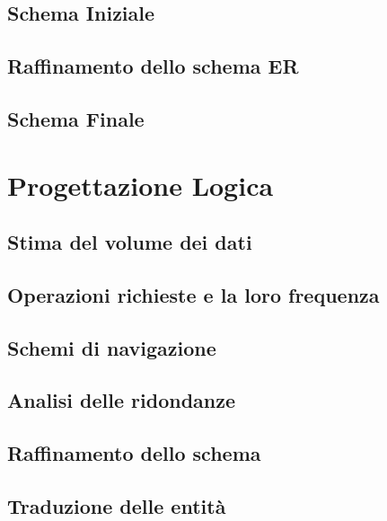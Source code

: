 \documentclass{article}
\begin{document}
\subsection{Schema Iniziale}


\subsection{Raffinamento dello schema ER}


\subsection{Schema Finale}



\section{Progettazione Logica}

\subsection{Stima del volume dei dati}


\subsection{Operazioni richieste e la loro frequenza}


\subsection{Schemi di navigazione}


\subsection{Analisi delle ridondanze}


\subsection{Raffinamento dello schema} 


\subsection{Traduzione delle entità}

\end{document}
